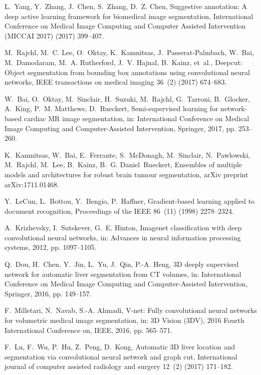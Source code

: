 \documentclass[twoside,espcrc2]{elsarticle}
\begin{document}
\begin{thebibliography}{10}
L.~Yang, Y.~Zhang, J.~Chen, S.~Zhang, D.~Z. Chen, Suggestive annotation: A deep
  active learning framework for biomedical image segmentation, International
  Conference on Medical Image Computing and Computer Assisted Intervention
  (MICCAI 2017) (2017) 399--407.

M.~Rajchl, M.~C. Lee, O.~Oktay, K.~Kamnitsas, J.~Passerat-Palmbach, W.~Bai,
  M.~Damodaram, M.~A. Rutherford, J.~V. Hajnal, B.~Kainz, et~al., Deepcut:
  Object segmentation from bounding box annotations using convolutional neural
  networks, IEEE transactions on medical imaging 36~(2) (2017) 674--683.

W.~Bai, O.~Oktay, M.~Sinclair, H.~Suzuki, M.~Rajchl, G.~Tarroni, B.~Glocker,
  A.~King, P.~M. Matthews, D.~Rueckert, Semi-supervised learning for
  network-based cardiac {MR} image segmentation, in: International Conference on
  Medical Image Computing and Computer-Assisted Intervention, Springer, 2017,
  pp. 253--260.

K.~Kamnitsas, W.~Bai, E.~Ferrante, S.~McDonagh, M.~Sinclair, N.~Pawlowski,
  M.~Rajchl, M.~Lee, B.~Kainz, B.~G. Daniel~Rueckert, Ensembles of multiple
  models and architectures for robust brain tumour segmentation, arXiv preprint
  arXiv:1711.01468.

Y.~LeCun, L.~Bottou, Y.~Bengio, P.~Haffner, Gradient-based learning applied to
  document recognition, Proceedings of the IEEE 86~(11) (1998) 2278--2324.

A.~Krizhevsky, I.~Sutskever, G.~E. Hinton, Imagenet classification with deep
  convolutional neural networks, in: Advances in neural information processing
  systems, 2012, pp. 1097--1105.

Q.~Dou, H.~Chen, Y.~Jin, L.~Yu, J.~Qin, P.-A. Heng, 3{D} deeply supervised
  network for automatic liver segmentation from {CT} volumes, in: International
  Conference on Medical Image Computing and Computer-Assisted Intervention,
  Springer, 2016, pp. 149--157.

F.~Milletari, N.~Navab, S.-A. Ahmadi, V-net: {F}ully convolutional neural
  networks for volumetric medical image segmentation, in: 3D Vision (3DV), 2016
  Fourth International Conference on, IEEE, 2016, pp. 565--571.

F.~Lu, F.~Wu, P.~Hu, Z.~Peng, D.~Kong, Automatic {3D} liver location and
  segmentation via convolutional neural network and graph cut, International
  journal of computer assisted radiology and surgery 12~(2) (2017) 171--182.


\end{thebibliography}
\end{document}
